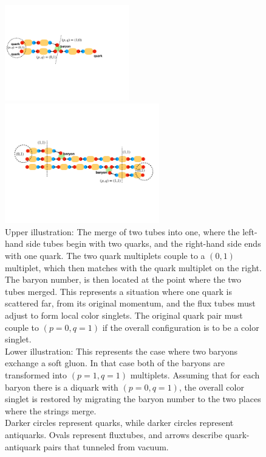 \documentclass[aps, prc, 12pt, nofootinbib, showpacs, superscriptaddress, tightenlines, groupedaddress]{revtex4-2}
\begin{document}
\begin{figure}
\centerline{\includegraphics[width=0.48\textwidth]{figs/simplemerge.pdf}}
\centerline{\includegraphics[width=0.6\textwidth]{figs/gluonexchange.pdf}}
\caption{\label{fig:merge}
Upper illustration: The merge of two tubes into one, where the left-hand side tubes begin with two quarks, and the right-hand side ends with one quark. The two quark multiplets couple to a $(0,1)$ multiplet, which then matches with the quark multiplet on the right. The baryon number, is then located at the point where the two tubes merged. This represents a situation where one quark is scattered far, from its original momentum, and the flux tubes must adjust to form local color singlets. The original quark pair must couple to $(p=0,q=1)$ if the overall configuration is to be a color singlet.\\
Lower illustration: This represents the case where two baryons exchange a soft gluon. In that case both of the baryons are transformed into $(p=1,q=1)$ multiplets. Assuming that for each baryon there is a diquark with $(p=0,q=1)$, the overall color singlet is restored by migrating the baryon number to the two places where the strings merge.\\
Darker circles represent quarks, while darker circles represent antiquarks. Ovals represent fluxtubes, and arrows describe quark-antiquark pairs that tunneled from vacuum.
}
\end{figure}
\end{document}

